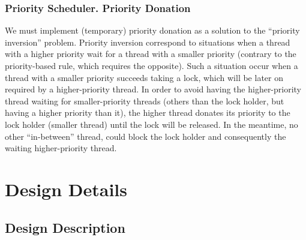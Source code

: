 \subsubsection{Priority Scheduler. Priority Donation}

We must implement (temporary) priority donation as a solution to the ``priority inversion'' problem.
Priority inversion correspond to situations when a thread with a higher priority wait for a thread with a smaller priority
(contrary to the priority-based rule, which requires the opposite).
Such a situation occur when a thread with a smaller priority succeeds taking a lock, which will be later on required by
a higher-priority thread. In order to avoid having the higher-priority thread waiting for smaller-priority threads
(others than the lock holder, but having a higher priority than it), the higher thread donates its priority to the lock
holder (smaller thread) until the lock will be released. In the meantime, no other ``in-between'' thread, could block the
lock holder and consequently the waiting higher-priority thread.  



\section{Design Details}

\subsection{Design Description}

\subsubsection{\taskA}

